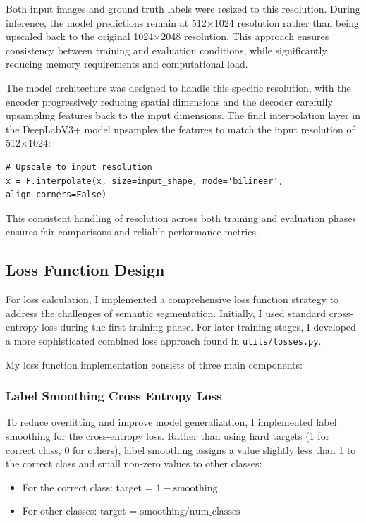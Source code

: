 \documentclass[]{article}
\begin{document}
Both input images and ground truth labels were resized to this resolution. During inference, the model predictions remain at 512×1024 resolution rather than being upscaled back to the original 1024×2048 resolution. This approach ensures consistency between training and evaluation conditions, while significantly reducing memory requirements and computational load.

The model architecture was designed to handle this specific resolution, with the encoder progressively reducing spatial dimensions and the decoder carefully upsampling features back to the input dimensions. The final interpolation layer in the DeepLabV3+ model upsamples the features to match the input resolution of 512×1024:

\begin{verbatim}
# Upscale to input resolution
x = F.interpolate(x, size=input_shape, mode='bilinear', align_corners=False)
\end{verbatim}

This consistent handling of resolution across both training and evaluation phases ensures fair comparisons and reliable performance metrics.

\subsection{Loss Function Design}

For loss calculation, I implemented a comprehensive loss function strategy to address the challenges of semantic segmentation. Initially, I used standard cross-entropy loss during the first training phase. For later training stages, I developed a more sophisticated combined loss approach found in \texttt{utils/losses.py}.

My loss function implementation consists of three main components:

\subsubsection{Label Smoothing Cross Entropy Loss}
To reduce overfitting and improve model generalization, I implemented label smoothing for the cross-entropy loss. Rather than using hard targets (1 for correct class, 0 for others), label smoothing assigns a value slightly less than 1 to the correct class and small non-zero values to other classes:

\begin{itemize}
    \item For the correct class: target = $1 - \text{smoothing}$
    \item For other classes: target = $\text{smoothing} / \text{num\_classes}$
\end{itemize}
\end{document}
